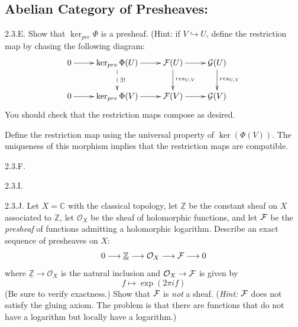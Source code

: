 \newpage 
\subsection{Abelian Category of Presheaves:}

\begin{exercise}{2.3.E.} 
Show that $\ker_{{pre}} \Phi$ is a presheaf. (Hint: if $V \hookrightarrow U$, define the restriction map by chasing the following diagram:
\[ \xymatrix{
    0 \ar[r] & \ker_{pre} \Phi(U) \ar[r] \ar@{-->}[d]^{\exists !} & \FF(U) \ar[r] \ar[d]^{res_{U,V}} & \GG(U) \ar[d]^{{res}_{U,V}} \\
    0 \ar[r] & \ker_{{pre}} \Phi(V) \ar[r] & \FF(V) \ar[r] & \GG(V) } \]
You should check that the restriction maps compose as desired.
\end{exercise}
\begin{solution}
    Define the restriction map using the universal property of $\ker(\Phi(V))$. The uniqueness of this morphism implies that the restriction maps are compatible. 
\end{solution}

\begin{exercise}{2.3.F.} 

\end{exercise}
\begin{solution}
    \todo{}
\end{solution}


\begin{exercise}{2.3.I.} 

\end{exercise}
\begin{solution}
    \todo{}
\end{solution}

\begin{exercise}{2.3.J.} 
Let $X = \mathbb{C}$ with the classical topology, let $\underline{\mathbb{Z}}$ be the constant sheaf on $X$ associated to $\mathbb{Z}$, let $\mathcal{O}_X$ be the sheaf of holomorphic functions, and let $\mathcal{F}$ be the \emph{presheaf} of functions admitting a holomorphic logarithm. Describe an exact sequence of presheaves on $X$:
\[ 0 \longrightarrow \underline{\mathbb{Z}} \longrightarrow \mathcal{O}_X \longrightarrow \mathcal{F} \longrightarrow 0 \]
where $\underline{\mathbb{Z}} \to \mathcal{O}_X$ is the natural inclusion and $\mathcal{O}_X \to \mathcal{F}$ is given by
\[ f \longmapsto \exp(2\pi i f) \]
(Be sure to verify exactness.) Show that $\mathcal{F}$ is \emph{not} a sheaf.
(\emph{Hint:} $\mathcal{F}$ does not satisfy the gluing axiom. The problem is that there are functions that do not have a logarithm but locally have a logarithm.)
\end{exercise}
\begin{solution}
    \todo{}
\end{solution}
\newpage
